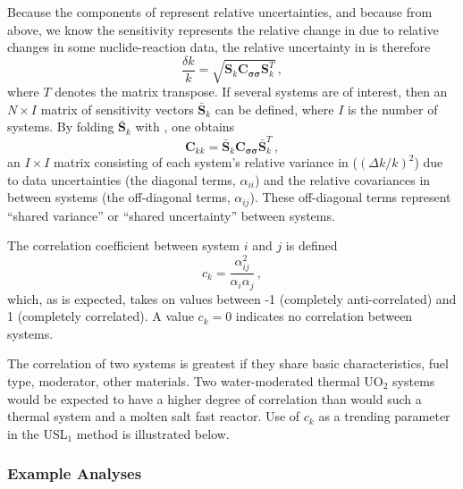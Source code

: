 Because the components of \cov represent relative uncertainties, and because 
from above, we know the \keff sensitivity represents the relative change in 
\keff due to relative changes in some nuclide-reaction data, the relative 
uncertainty in \keff is therefore
\begin{equation}
\frac{\delta k}{k} = \sqrt{ \mathbf{S}_k \mathbf{C_{\sigma \sigma}} 
                     \mathbf{S}_k^T } \, ,
\end{equation}
where $T$ denotes the matrix transpose.  If several systems are of interest, 
then an $N \times I$  matrix of sensitivity vectors $\mathbf{\bar{S}}_k$ can 
be defined, where $I$ is the number of systems.  By folding 
$\mathbf{\bar{S}}_k$ with \cov, one obtains
\begin{equation}
 \mathbf{C}_{kk} =  \mathbf{\bar{S}}_k \mathbf{C_{\sigma \sigma}} 
                    \mathbf{\bar{S}}_k^T  \, ,
\label{eq:kunc}
\end{equation}
an $I\times I$ matrix consisting of each system's relative variance in 
\keff (\ie $(\Delta k/k)^2$) due to data uncertainties (the diagonal terms, 
$\alpha_{ii}$) and the relative covariances in \keff between systems 
(the off-diagonal terms, $\alpha_{ij}$).  These off-diagonal terms 
represent ``shared variance'' or ``shared uncertainty'' between systems.  

The correlation coefficient between system $i$ and $j$ is defined
\begin{equation}
 c_{k} =  \frac{\alpha^2_{ij}}{\alpha_i \alpha_j}  \, ,
\label{eq:ck}
\end{equation}
which, as is expected, takes on values between -1 
(completely anti-correlated) and 1 (completely correlated). 
A value $c_k = 0$ indicates no correlation between systems.  

The correlation of two systems is greatest if they share basic 
characteristics, \eg fuel type, moderator, other materials.  Two 
water-moderated thermal UO$_2$ systems would be expected to have 
a higher degree of correlation than would such a thermal system 
and a molten salt fast reactor.  Use of $c_k$ as a trending 
parameter in the USL$_1$ method is illustrated below.


\subsubsection{Example Analyses}

